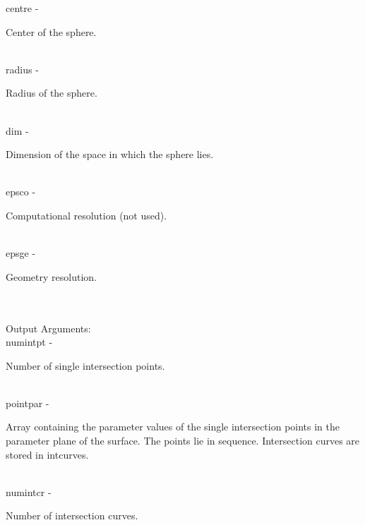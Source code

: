         \>\>    {\fov centre}\> - \>    \begin{minipg2}
                                Center of the sphere.
                                \end{minipg2}\\
        \>\>    {\fov radius}\> - \>    \begin{minipg2}
                                Radius of the sphere.
                                \end{minipg2}\\
        \>\>    {\fov dim}\> - \>       \begin{minipg2}
                                Dimension of the space in which the sphere lies.
                                \end{minipg2}\\
        \>\>    {\fov epsco}\> - \>     \begin{minipg2}
                                Computational resolution (not used).
                                \end{minipg2}\\
        \>\>    {\fov epsge}\> - \>     \begin{minipg2}
                                Geometry resolution.
                                \end{minipg2}\\
\\
        \>Output Arguments:\\
        \>\>    {\fov numintpt}\> - \>\begin{minipg2}
                                Number of single intersection points.
                                \end{minipg2}\\
        \>\>    {\fov pointpar}\> - \>  \begin{minipg2}
                                Array containing the parameter values of the single
                                intersection points in the parameter plane of the
                                surface. The points lie in sequence. Intersection curves
                                are stored in intcurves.
                                \end{minipg2}\\[0.8ex]
        \>\>    {\fov numintcr}\> - \>  \begin{minipg2}
                                Number of intersection curves.
                                \end{minipg2}\\
